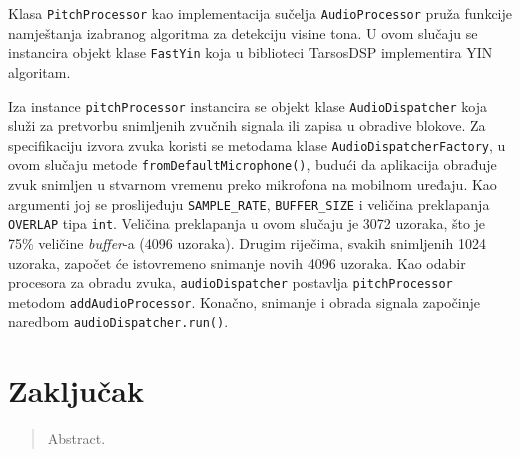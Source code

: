 \documentclass[times, utf8, zavrsni, numeric]{fer}
\begin{document}
Klasa \verb|PitchProcessor| kao implementacija sučelja \verb|AudioProcessor| pruža funkcije namještanja izabranog algoritma za detekciju visine tona. U ovom slučaju se instancira objekt klase \verb|FastYin| koja u biblioteci TarsosDSP implementira YIN algoritam.

Iza instance \verb|pitchProcessor| instancira se objekt klase \verb|AudioDispatcher| koja služi za pretvorbu snimljenih zvučnih signala ili zapisa u obradive blokove. Za specifikaciju izvora zvuka koristi se metodama klase \verb|AudioDispatcherFactory|, u ovom slučaju metode \verb|fromDefaultMicrophone()|, budući da aplikacija obrađuje zvuk snimljen u stvarnom vremenu preko mikrofona na mobilnom uređaju. Kao argumenti joj se proslijeđuju \verb|SAMPLE_RATE|, \verb|BUFFER_SIZE| i veličina preklapanja \verb|OVERLAP| tipa \verb|int|. Veličina preklapanja u ovom slučaju je 3072 uzoraka, što je 75\% veličine \textit{buffer}-a (4096 uzoraka). Drugim riječima, svakih snimljenih 1024 uzoraka, započet će istovremeno snimanje novih 4096 uzoraka. Kao odabir procesora za obradu zvuka, \verb|audioDispatcher| postavlja \verb|pitchProcessor| metodom \verb|addAudioProcessor|. Konačno, snimanje i obrada signala započinje naredbom \verb|audioDispatcher.run()|.





\chapter{Zaključak}




\begin{sazetak}

\end{sazetak}

\begin{abstract}
Abstract.

\end{abstract}
\end{document}
